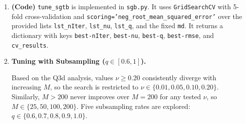 \documentclass[a4paper,12pt]{article}
\begin{document}
\begin{enumerate}
\begin{enumerate}[label=(\alph*)]
\textbf{Conclusions.}
\begin{itemize}
    \item \emph{Shrinkage and iterations trade off.} A larger $\nu$ causes rapid overfitting:
    the model with $\nu=1.0$ diverges immediately, while $\nu=0.01$ takes over 100
    iterations to overfit. This confirms the well-known result that smaller shrinkage requires
    more iterations to achieve the same (or better) minimum, but results in better
    generalisation.

    \item \emph{Optimal $M$ decreases as $\nu$ increases.} For $\nu=0.10$ the best validation
    error is at $M=10$; for $\nu=0.05$ it is at $M=25$; for $\nu=0.01$ it is at $M=100$.
    Practitioners who set $\nu=0.1$ (a common default) should use early stopping or keep
    $M$ small.

    \item \emph{Values we can omit in future searches.} $\nu \ge 0.20$ always diverges,
    so these values can be safely excluded. Similarly, for the best-performing $\nu$ values
    ($\le 0.10$), iterations beyond $M=200$ consistently increase RMSE and can be dropped.

    \item \emph{Optimal parameters for $q=1$:} $\nu=0.05$, $M=25$,
    validation RMSE $= 94.94$.
\end{itemize}

\item \textbf{(Code)} \texttt{tune\_sgtb} is implemented in \texttt{sgb.py}.
It uses \texttt{GridSearchCV} with 5-fold cross-validation and
\texttt{scoring='neg\_root\_mean\_squared\_error'} over the provided lists
\texttt{lst\_nIter}, \texttt{lst\_nu}, \texttt{lst\_q}, and the fixed \texttt{md}.
It returns a dictionary with keys \texttt{best-nIter}, \texttt{best-nu},
\texttt{best-q}, \texttt{best-rmse}, and \texttt{cv\_results}.

\item \textbf{Tuning with Subsampling ($q \in [0.6, 1]$).}

Based on the Q3d analysis, values $\nu \ge 0.20$ consistently diverge with increasing
$M$, so the search is restricted to $\nu \in \{0.01, 0.05, 0.10, 0.20\}$. Similarly,
$M > 200$ never improves over $M=200$ for any tested $\nu$, so
$M \in \{25, 50, 100, 200\}$. Five subsampling rates are explored: $q \in \{0.6, 0.7,
0.8, 0.9, 1.0\}$.


\end{enumerate}
\end{enumerate}
\end{document}
